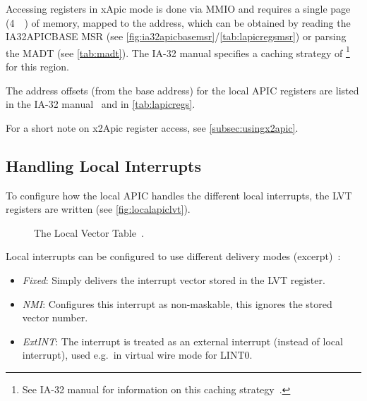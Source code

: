 Accessing registers in xApic mode is done via MMIO and requires a single page (\SI{4}{\kilo\byte}) of memory, mapped to the  address, which can be obtained by reading the IA32\textunderscore{}APIC\textunderscore{}BASE MSR (see \autoref{fig:ia32apicbasemsr}/\autoref{tab:lapicregsmsr}) or parsing the MADT (see \autoref{tab:madt}).
The IA-32 manual specifies a caching strategy of \footnote{
  See IA-32 manual for information on this caching strategy~\autocite[sec.~3.12.3]{ia32}.}
~\autocite[sec.~3.11.4.1]{ia32} for this region.

The address offsets (from the base address) for the local APIC registers are listed in the IA-32 manual~\autocite[sec.~3.11.4.1]{ia32} and in \autoref{tab:lapicregs}.

For a short note on x2Apic register access, see \autoref{subsec:usingx2apic}.

\subsection{Handling Local Interrupts}
\label{subsec:lapiclvtinit}

To configure how the local APIC handles the different local interrupts, the LVT registers are written (see \autoref{fig:localapiclvt}).

\begin{figure}[h]
  \centering
  \begin{subfigure}[b]{0.7\textwidth}
    
  \end{subfigure}
  \caption{The Local Vector Table~\autocite[sec.~3.11.5.1]{ia32}.}
  \label{fig:localapiclvt}
\end{figure}

Local interrupts can be configured to use different delivery modes (excerpt)~\autocite[sec.~3.11.5.1]{ia32}:

\begin{itemize}
  \item \textit{Fixed}: Simply delivers the interrupt vector stored in the LVT register.
  \item \textit{NMI}: Configures this interrupt as non-maskable, this ignores the stored vector number.
  \item \textit{ExtINT}: The interrupt is treated as an external interrupt (instead of local interrupt), used e.g.\ in virtual wire mode for LINT0\@.
\end{itemize}

